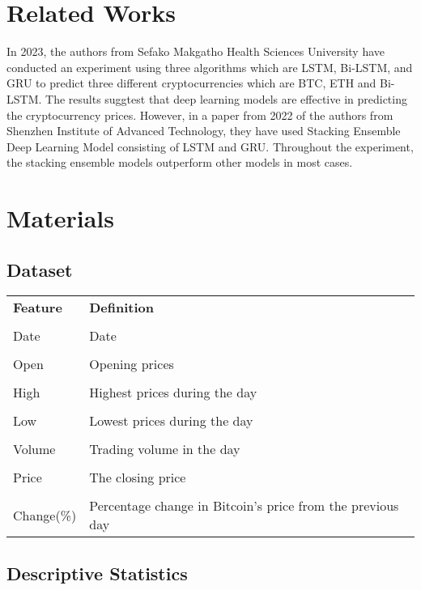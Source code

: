 \documentclass{ieeeojies}
\begin{document}
\section{Related Works}
In 2023, the authors \cite{seabe2023forecasting} from Sefako Makgatho Health Sciences University have conducted an experiment using three algorithms which are LSTM, Bi-LSTM, and GRU to predict three different cryptocurrencies which are BTC, ETH and Bi-LSTM. The results suggtest that deep learning models are effective in predicting the cryptocurrency prices. However, in a paper from 2022 of the authors \cite{ye2022stacking} from Shenzhen Institute of Advanced Technology, they have used Stacking Ensemble Deep Learning Model consisting of LSTM and GRU. Throughout the experiment, the stacking ensemble models outperform other models in most cases.


\section{Materials}
\subsection{Dataset}
\begin{table}[H]
\centering
\begin{tabular}{l l}
 \textbf{Feature} & \textbf{Definition} \\ \\
 Date & Date \\ \\
 Open & Opening prices\\ \\
 High & Highest prices during the day \\ \\
 Low & Lowest prices during the day\\ \\
 Volume & Trading volume in the day\\ \\
Price & The closing price\\ \\
 Change(\%) & Percentage change in Bitcoin's price from the previous day\\
\end{tabular}
\end{table}
\subsection{Descriptive Statistics}
\end{document}
